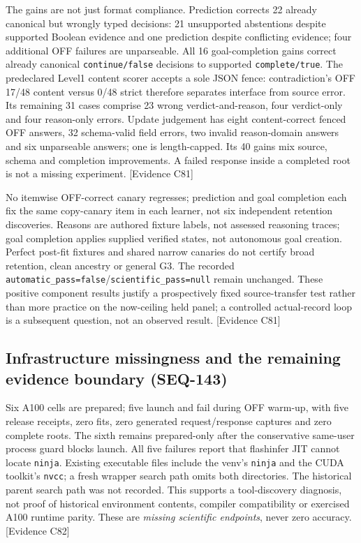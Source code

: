 \documentclass{article}
\begin{document}
The gains are not just format compliance. Prediction corrects 22 already
canonical but wrongly typed decisions: 21 unsupported abstentions despite
supported Boolean evidence and one prediction despite conflicting evidence;
four additional OFF failures are unparseable. All 16 goal-completion gains
correct already canonical \texttt{continue/false} decisions to supported
\texttt{complete/true}. The predeclared Level1 content scorer accepts a sole
JSON fence: contradiction's OFF 17/48 content versus 0/48 strict therefore
separates interface from source error. Its remaining 31 cases comprise 23 wrong
verdict-and-reason, four verdict-only and four reason-only errors. Update
judgement has eight content-correct fenced OFF answers, 32 schema-valid field
errors, two invalid reason-domain answers and six unparseable answers; one is
length-capped. Its 40 gains mix source, schema and completion improvements.
A failed response inside a completed root is not a missing experiment.
\textsf{[Evidence C81]}

No itemwise OFF-correct canary regresses; prediction and goal completion each
fix the same copy-canary item in each learner, not six independent retention
discoveries. Reasons are authored fixture labels, not assessed reasoning traces;
goal completion applies supplied verified states, not autonomous goal creation.
Perfect post-fit fixtures and shared narrow canaries do not certify broad
retention, clean ancestry or general G3. The recorded
\texttt{automatic\_pass=false}/\texttt{scientific\_pass=null} remain unchanged.
These positive component results justify a prospectively fixed source-transfer
test rather than more practice on the now-ceiling held panel; a controlled
actual-record loop is a subsequent question, not an observed result.
\textsf{[Evidence C81]}

\subsection{Infrastructure missingness and the remaining evidence boundary (SEQ-143)}
\label{sec:bounded-infrastructure}
Six A100 cells are prepared; five launch and fail during OFF warm-up, with
five release receipts, zero fits, zero generated request/response captures and
zero complete roots. The sixth remains prepared-only after the conservative
same-user process guard blocks launch. All five failures report that flashinfer
JIT cannot locate \texttt{ninja}. Existing executable files include the venv's
\texttt{ninja} and the CUDA toolkit's \texttt{nvcc}; a fresh wrapper search path
omits both directories. The historical parent search path was not recorded.
This supports a tool-discovery diagnosis, not proof of historical environment
contents, compiler compatibility or exercised A100 runtime parity. These are
\emph{missing scientific endpoints}, never zero accuracy. \textsf{[Evidence C82]}
\end{document}
